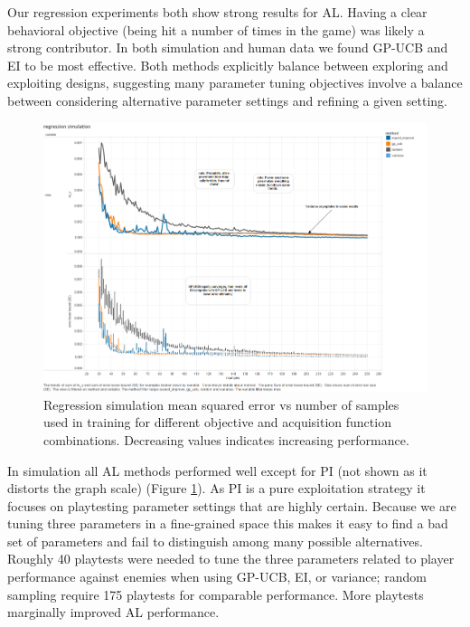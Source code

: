 \documentclass{sig-alternate}
\begin{document}
Our regression experiments both show strong results for AL.
Having a clear behavioral objective (being hit a number of times in the game) was likely a strong contributor.
In both simulation and human data we found GP-UCB and EI to be most effective.
Both methods explicitly balance between exploring and exploiting designs, suggesting many parameter tuning objectives involve a balance between considering alternative parameter settings and refining a given setting.

\begin{figure}[tbph]
\centering
\includegraphics[width=\linewidth]{regression_simulation}
\caption{Regression simulation mean squared error vs number of samples used in training for different objective and acquisition function combinations. Decreasing values indicates increasing performance.}
\label{fig:reg_sim}
\end{figure}
In simulation all AL methods performed well except for PI (not shown as it distorts the graph scale) (Figure \ref{fig:reg_sim}).
As PI is a pure exploitation strategy it focuses on playtesting parameter settings that are highly certain.
Because we are tuning three parameters in a fine-grained space this makes it easy to find a bad set of parameters and fail to distinguish among many possible alternatives.
%
%
Roughly 40 playtests were needed to tune the three parameters related to player performance against enemies when using GP-UCB, EI, or variance; random sampling require 175 playtests for comparable performance.
More playtests marginally improved AL performance.
\end{document}
